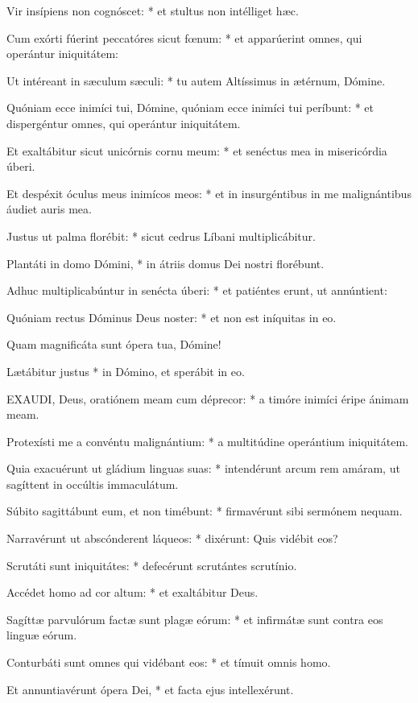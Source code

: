 Vir insípiens non cognóscet: * et stultus non intélliget hæc.

Cum exórti fúerint peccatóres sicut fœnum: * et apparúerint omnes, qui operántur iniquitátem:

Ut intéreant in sæculum sæculi: * tu autem Altíssimus in ætérnum, Dómine.

Quóniam ecce inimíci tui, Dómine, quóniam ecce inimíci tui períbunt: * et dispergéntur omnes, qui operántur iniquitátem.

Et exaltábitur sicut unicórnis cornu meum: * et senéctus mea in misericórdia úberi.

Et despéxit óculus meus inimícos meos: * et in insurgéntibus in me malignántibus áudiet auris mea.

Justus ut palma florébit: * sicut cedrus Líbani multiplicábitur.

Plantáti in domo Dómini, * in átriis domus Dei nostri florébunt.

Adhuc multiplicabúntur in senécta úberi: * et patiéntes erunt, ut annúntient:

Quóniam rectus Dóminus Deus noster: * et non est iníquitas in eo.

 Quam magnificáta sunt ópera tua, Dómine!

 Lætábitur justus * in Dómino, et sperábit in eo.


\lettrine[lines=2]{E}{XAUDI}, Deus, oratiónem meam cum déprecor: * a timóre inimíci éripe ánimam meam.

Protexísti me a convéntu malignántium: * a multitúdine operántium iniquitátem.

Quia exacuérunt ut gládium linguas suas: * intendérunt arcum rem amáram, ut sagíttent in occúltis immaculátum.

Súbito sagittábunt eum, et non timébunt: * firmavérunt sibi sermónem nequam.

Narravérunt ut abscónderent láqueos: * dixérunt: Quis vidébit eos?

Scrutáti sunt iniquitátes: * defecérunt scrutántes scrutínio.

Accédet homo ad cor altum: * et exaltábitur Deus.

Sagíttæ parvulórum factæ sunt plagæ eórum: * et infirmátæ sunt contra eos linguæ eórum.

Conturbáti sunt omnes qui vidébant eos: * et tímuit omnis homo.

Et annuntiavérunt ópera Dei, * et facta ejus intellexérunt.

